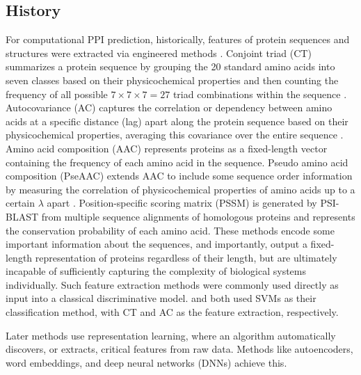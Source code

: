 \documentclass{article}
\begin{document}
\subsection{History}
For computational PPI prediction, historically, features of protein sequences and structures were extracted via engineered methods \citep{charih_sequence-based_2025}. Conjoint triad (CT) summarizes a protein sequence by grouping the 20 standard amino acids into seven classes based on their physicochemical properties and then counting the frequency of all possible $7\times7\times7=27$ triad combinations within the sequence \citep{shen_predicting_2007}. Autocovariance (AC) captures the correlation or dependency between amino acids at a specific distance (lag) apart along the protein sequence based on their physicochemical properties, averaging this covariance over the entire sequence \citep{guo_using_2008}. Amino acid composition (AAC) represents proteins as a fixed-length vector containing the frequency of each amino acid in the sequence. Pseudo amino acid composition (PseAAC) extends AAC to include some sequence order information by measuring the correlation of physicochemical properties of amino acids up to a certain $\lambda$ apart \citep{chou_pseaac_2001}. Position-specific scoring matrix (PSSM) is generated by PSI-BLAST \citep{altschul_gapped_1997} from multiple sequence alignments of homologous proteins and represents the conservation probability of each amino acid. These methods encode some important information about the sequences, and importantly, output a fixed-length representation of proteins regardless of their length, but are ultimately incapable of sufficiently capturing the complexity of biological systems individually. Such feature extraction methods were commonly used directly as input into a classical discriminative model. \citet{shen_predicting_2007} and \citet{guo_using_2008} both used SVMs as their classification method, with CT and AC as the feature extraction, respectively.

Later methods use representation learning, where an algorithm automatically discovers, or extracts, critical features from raw data. Methods like autoencoders, word embeddings, and deep neural networks (DNNs) achieve this.
\end{document}
